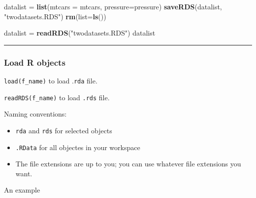 \documentclass[
  a4paper,
  twoside,
  openright]{book}
\newenvironment{Shaded}{\begin{snugshade}}{\end{snugshade}}
\newcommand{\AttributeTok}[1]{\textcolor[rgb]{0.13,0.29,0.53}{#1}}
\newcommand{\FunctionTok}[1]{\textcolor[rgb]{0.13,0.29,0.53}{\textbf{#1}}}
\newcommand{\NormalTok}[1]{#1}
\newcommand{\OtherTok}[1]{\textcolor[rgb]{0.56,0.35,0.01}{#1}}
\newcommand{\StringTok}[1]{\textcolor[rgb]{0.31,0.60,0.02}{#1}}
\providecommand{\tightlist}{%
  \setlength{\itemsep}{0pt}\setlength{\parskip}{0pt}}
\theoremstyle{definition}
\theoremstyle{definition}
\theoremstyle{definition}
\theoremstyle{definition}
\theoremstyle{remark}
\begin{document}
\begin{Shaded}
\begin{Highlighting}[]
\NormalTok{datalist }\OtherTok{=} \FunctionTok{list}\NormalTok{(}\AttributeTok{mtcars =}\NormalTok{ mtcars, }\AttributeTok{pressure=}\NormalTok{pressure)}
\FunctionTok{saveRDS}\NormalTok{(datalist, }\StringTok{"twodatasets.RDS"}\NormalTok{)}
\FunctionTok{rm}\NormalTok{(}\AttributeTok{list=}\FunctionTok{ls}\NormalTok{())}

\NormalTok{datalist }\OtherTok{=} \FunctionTok{readRDS}\NormalTok{(}\StringTok{"twodatasets.RDS"}\NormalTok{)}
\NormalTok{datalist}
\end{Highlighting}
\end{Shaded}

\begin{center}\rule{0.5\linewidth}{0.5pt}\end{center}

\subsubsection*{Load R objects}\label{load-r-objects}

\texttt{load(f\_name)} to load .\texttt{rda} file.

\texttt{readRDS(f\_name)} to load \texttt{.rds} file.

Naming conventions:

\begin{itemize}
\tightlist
\item
  \texttt{rda} and \texttt{rds} for {selected} objects
\item
  \texttt{.RData} for {all} objectes in your workspace
\item
  The file extensions are up to you; you can use whatever file extensions you want.
\end{itemize}

An example
\end{document}
